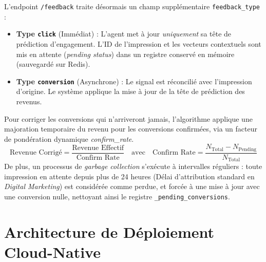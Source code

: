 L'endpoint \texttt{/feedback} traite désormais un champ supplémentaire \texttt{feedback\_type} :
\begin{itemize}
    \item \textbf{Type \texttt{click}} (Immédiat) : L'agent met à jour \textit{uniquement} sa tête de prédiction d'engagement. L'ID de l'impression et les vecteurs contextuels sont mis en attente (\textit{pending status}) dans un registre conservé en mémoire (sauvegardé sur Redis).
    \item \textbf{Type \texttt{conversion}} (Asynchrone) : Le signal est réconcilié avec l'impression d'origine. Le système applique la mise à jour de la tête de prédiction des revenus.
\end{itemize}

Pour corriger les conversions qui n'arriveront jamais, l'algorithme applique une majoration temporaire du revenu pour les conversions confirmées, via un facteur de pondération dynamique \textit{confirm\_rate}. 
$$ \text{Revenue Corrigé} = \frac{\text{Revenue Effectif}}{\text{Confirm Rate}} \quad \text{avec} \quad \text{Confirm Rate} = \frac{N_{\text{Total}} - N_{\text{Pending}}}{N_{\text{Total}}} $$
De plus, un processus de \textit{garbage collection} s'exécute à intervalles réguliers : toute impression en attente depuis plus de 24 heures (Délai d'attribution standard en \textit{Digital Marketing}) est considérée comme perdue, et forcée à une mise à jour avec une conversion nulle, nettoyant ainsi le registre \texttt{\_pending\_conversions}.


\section{Architecture de Déploiement Cloud-Native}

